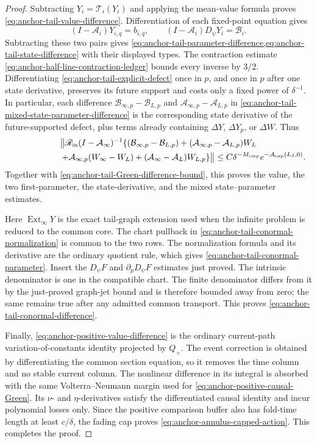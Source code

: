 \begin{proof}
Subtracting
\(Y_i=\mathcal T_i(Y_i)\) and applying the mean-value formula proves
\cref{eq:anchor-tail-value-difference}.  Differentiation of each fixed-point
equation gives
\[
 (I-\mathcal A_i)Y_{i,q}=b_{i,q},\qquad
 (I-\mathcal A_i)D_\psi Y_i=\mathcal B_i .
\]
Subtracting these two pairs gives
\cref{eq:anchor-tail-parameter-difference,eq:anchor-tail-state-difference}
with their displayed types.  The contraction estimate
\cref{eq:anchor-half-line-contraction-ledger} bounds every inverse by
\(3/2\).  Differentiating
\cref{eq:anchor-tail-explicit-defect} once in \(p\), and once in \(p\)
after one state derivative, preserves its future support and costs only a
fixed power of \(\delta^{-1}\).  In particular, each difference
\(\mathcal B_{\infty,p}-\mathcal B_{L,p}\) and
\(\mathcal A_{\infty,p}-\mathcal A_{L,p}\) in
\cref{eq:anchor-tail-mixed-state-parameter-difference} is the corresponding
state derivative of the future-supported defect, plus terms already
containing \(\Delta Y\), \(\Delta Y_p\), or \(\Delta W\).  Thus
\begin{multline}
 \bigl\|\mathscr R_{\rm in}(I-\mathcal A_\infty)^{-1}
 \{(\mathcal B_{\infty,p}-\mathcal B_{L,p})
   +(\mathcal A_{\infty,p}-\mathcal A_{L,p})W_L\\
 \hspace{2.1cm}
   +\mathcal A_{\infty,p}(W_\infty-W_L)
   +(\mathcal A_\infty-\mathcal A_L)W_{L,p}\}\bigr\|
 \le C\delta^{-M_{\rm cmp}}
       e^{-\mathcal A_{\rm cap}(L_\delta,0)}.       \label{eq:anchor-tail-mixed-Green-bound}
\end{multline}
Together with
\cref{eq:anchor-tail-Green-difference-bound}, this proves the value,
the two first-parameter, the state-derivative, and the mixed
state--parameter estimates.

Here \(\operatorname{Ext}_\infty Y\) is the exact tail-graph extension
used when the infinite problem is reduced to the common core.  The chart
pullback in
\cref{eq:anchor-tail-conormal-normalization} is common to the two rows.
The normalization formula and its derivative are the ordinary quotient
rule, which gives \cref{eq:anchor-tail-conormal-parameter}.  Insert the
\(D_\psi F\) and \(\partial_pD_\psi F\) estimates just proved.  The
intrinsic denominator is one in the compatible chart.  The finite
denominator differs from it by the just-proved graph-jet bound and is
therefore bounded away from zero; the same remains true after any admitted
common transport.  This proves
\cref{eq:anchor-tail-conormal-difference}.

Finally, \cref{eq:anchor-positive-value-difference} is the ordinary
current-path variation-of-constants identity projected by \(Q_+\).
The event correction is obtained by differentiating the common section
equation, so it removes the time column and no stable current column.
The nonlinear difference in its integral is absorbed with the same
Volterra--Neumann margin used for
\cref{eq:anchor-positive-causal-Green}.  Its \(\nu\)- and \(\eta\)-derivatives
satisfy the differentiated causal identity and incur polynomial losses
only.  Since the positive comparison buffer also has fold-time length at
least \(c/\delta\), the fading cap proves
\cref{eq:anchor-annulus-capped-action}.  This completes the proof.
\end{proof}

